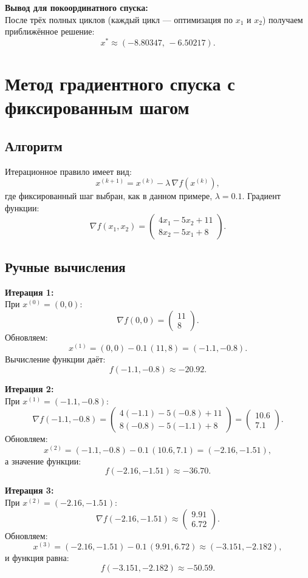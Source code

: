 \documentclass{article}
\begin{document}
\medskip
\textbf{Вывод для покоординатного спуска:}\\
После трёх полных циклов (каждый цикл --- оптимизация по \(x_1\) и \(x_2\)) получаем приближённое решение:
\[
x^*\approx (-8.80347,\,-6.50217).
\]

\section{Метод градиентного спуска с фиксированным шагом}
\subsection{Алгоритм}
Итерационное правило имеет вид:
\[
x^{(k+1)}=x^{(k)}-\lambda\,\nabla f(x^{(k)}),
\]
где фиксированный шаг выбран, как в данном примере, \(\lambda=0.1\). Градиент функции:
\[
\nabla f(x_1,x_2)=
\begin{pmatrix}
4x_1-5x_2+11\\[1mm]
8x_2-5x_1+8
\end{pmatrix}.
\]

\subsection{Ручные вычисления}
\textbf{Итерация 1:}\\
При \(x^{(0)}=(0,0)\):
\[
\nabla f(0,0)=
\begin{pmatrix}
11\\
8
\end{pmatrix}.
\]
Обновляем:
\[
x^{(1)}=(0,0)-0.1\,(11,8)=(-1.1,-0.8).
\]
Вычисление функции даёт:
\[
f(-1.1,-0.8)\approx-20.92.
\]

\medskip
\textbf{Итерация 2:}\\
При \(x^{(1)}=(-1.1,-0.8)\):
\[
\nabla f(-1.1,-0.8)=
\begin{pmatrix}
4(-1.1)-5(-0.8)+11\\[1mm]
8(-0.8)-5(-1.1)+8
\end{pmatrix}
=\begin{pmatrix}
10.6\\[1mm]
7.1
\end{pmatrix}.
\]
Обновляем:
\[
x^{(2)}=(-1.1,-0.8)-0.1\,(10.6,7.1)=(-2.16,-1.51),
\]
а значение функции:
\[
f(-2.16,-1.51)\approx-36.70.
\]

\medskip
\textbf{Итерация 3:}\\
При \(x^{(2)}=(-2.16,-1.51)\):
\[
\nabla f(-2.16,-1.51)\approx
\begin{pmatrix}
9.91\\[1mm]
6.72
\end{pmatrix}.
\]
Обновляем:
\[
x^{(3)}=(-2.16,-1.51)-0.1\,(9.91,6.72)\approx(-3.151,-2.182),
\]
и функция равна:
\[
f(-3.151,-2.182)\approx-50.59.
\]
\end{document}
